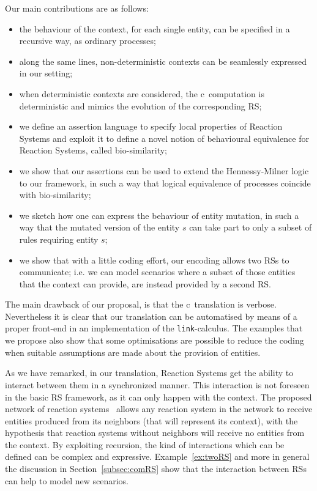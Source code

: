 Our main contributions are as follows:
\begin{itemize}
\item the behaviour of the context, for each single 
entity,
can be
specified in a recursive way, as ordinary processes;
\item along the same lines, non-deterministic contexts can be seamlessly expressed in our setting; 
\item when deterministic contexts are considered, the c\CNA \
computation is deterministic and mimics the evolution of the corresponding RS;
\item we define an assertion language to specify local properties of 
Reaction Systems and exploit it to define a novel notion of behavioural equivalence for Reaction Systems, called bio-similarity;
\item we show that our assertions can be used to extend the Hennessy-Milner logic to our framework, in such a way that logical equivalence of processes coincide with bio-similarity;
\item we sketch how one can express the behaviour of entity mutation,
in such a way that {\color{red} the mutated version of the entity
$s$ can}  take part to only a subset of rules requiring entity $s$;
\item we show that with a little coding effort, our encoding allows two RSs to
communicate; i.e. we can model scenarios where a subset of those entities that the context  can
provide, are instead provided by a second RS.
\end{itemize}

The main drawback of our proposal, is that the c\CNA \ translation is
verbose. Nevertheless it is clear that our
translation can be automatised by means of a proper front-end in
an implementation of the {\tt link}-calculus. 
The examples that we propose also show that some optimisations are possible
to reduce the coding when suitable assumptions are made about the provision of entities.

As we have remarked, in our translation, Reaction Systems 
get the ability to interact between them in a synchronized manner. 
This interaction is not foreseen in
the basic RS framework, as it can only happen with the context.
{\color{red}The proposed network of reaction systems~\cite{BLR20} allows
any reaction system in the network to receive entities 
produced from its neighbors (that will represent its context), with the hypothesis that  
reaction systems without neighbors will receive no entities 
from the context. 
}
By exploiting recursion, the kind of interactions which can be 
defined can be complex and expressive.
Example~\ref{ex:twoRS} and more in general the discussion in 
Section~\ref{subsec:comRS}
 show that 
the interaction between RSs can help to model new scenarios.

